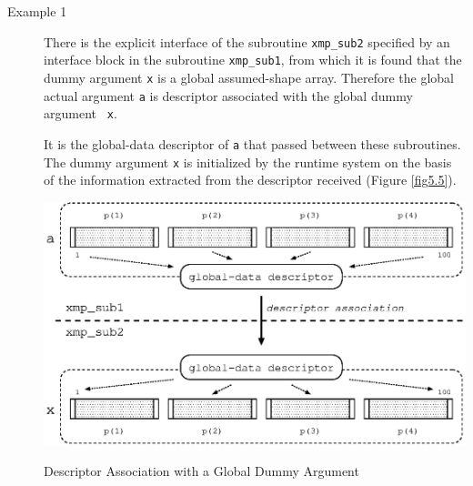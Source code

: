 \begin{description}

\item[Example 1]

	   There is the explicit interface of the subroutine
	   {\tt xmp\_sub2} specified by an interface block in the
	   subroutine {\tt xmp\_sub1}, from which it is found that the
	   dummy argument {\tt x} is a global assumed-shape
	   array. Therefore the global actual argument {\tt a} is
	   descriptor associated with the global dummy argument {\tt
	   x}.

	   It is the global-data descriptor of {\tt a} that passed
	   between these subroutines. The dummy argument {\tt x} is
	   initialized by the {\XMP} runtime system on the basis of the
	   information extracted from the descriptor received (Figure
	   \ref{fig5.5}).


\begin{myfigure}
 \includegraphics[scale=0.7]{figs/fig5.5.eps}
 \caption{Descriptor Association with a Global Dummy Argument}
 \label{fig5.5}
\end{myfigure}


\end{description}
